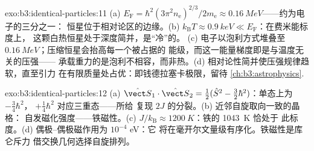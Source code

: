 \begin{solution}{exo:b3:identical-particles:11}
(a) $E_{\text{F}} = \hbar^2(3\pi^2n_{\text{e}})^{2/3}/2m_{\text{e}}
\approx \qty{0.16}{MeV}$——约为电子的三分之一：
恒星位于相对论区的边缘。(b)
$k_{\text{B}}T \approx \qty{0.9}{keV} \ll E_{\text{F}}$：在费米能标度上，
这颗白热恒星处于深度简并，是“冷”的。
(c) 电子以泡利方式堆叠至
$\qty{0.16}{MeV}$；压缩恒星会抬高每一个被占据的
能级，而这一能量梯度即是与温度无关的压强——
承载重力的是泡利不相容，而非热。(d)
相对论性简并使压强规律趋软，直至引力
在有限质量处占优：即钱德拉塞卡极限，留待
\cref{ch:b3:astrophysics}.
\end{solution}

\begin{solution}{exo:b3:identical-particles:12}
(a) $\hat{\vect S}_1\cdot\hat{\vect S}_2 = \tfrac12(\hat S^2 -
\tfrac32\hbar^2)$：单态上为 $-\tfrac34\hbar^2$，
$+\tfrac14\hbar^2$ 对应三重态——所给
复现 $2J$ 的分裂。(b) 近邻自旋取向一致的晶格：
自发磁化强度——铁磁性。(c) $J/k_{\text{B}}
\approx \qty{1200}{K}$：铁的 \qty{1043}{K} 恰处于
此标度。(d) 偶极–偶极磁作用为 $10^{-4}$ eV：它
将在毫开尔文量级有序化。铁磁性是库仑斥力
借交换几何选择自旋排列。
\end{solution}

